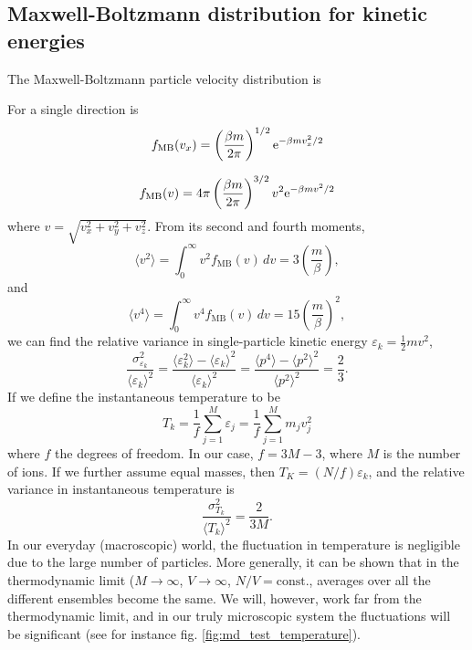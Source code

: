 \documentclass[11pt,bibliography=totoc,index=totoc]{scrbook}   %
\begin{document}
%
\subsection{Maxwell-Boltzmann distribution for kinetic energies}\label{sec:maxwell-boltzmann}
%


The Maxwell-Boltzmann particle velocity distribution is

For a single direction is
\begin{equation}
  f_{\text{MB}}(v_x) = \left(\frac{\beta m}{2\pi }\right)^{1/2} \mathrm{e}^{-\beta m v_x^2 / 2}
  \label{eq:maxboltz-vdist-1D}
\end{equation}

\begin{equation}
  f_{\text{MB}}(v) = 4\pi\left(\frac{\beta m}{2\pi }\right)^{3/2} v^2 \mathrm{e}^{-\beta m v^2 / 2}
  \label{eq:maxboltz-vdist}
\end{equation}
where $v=\sqrt{v_x^2+v_y^2+v_z^2}$.
From its second and fourth moments,
\begin{equation}
  \langle v^2 \rangle = \int_0^{\infty} v^2 f_{\text{MB}}(v) \,dv = 3\left(\frac{m}{\beta}\right),
\end{equation}
and
\begin{equation}
  \langle v^4 \rangle = \int_0^{\infty} v^4 f_{\text{MB}}(v) \,dv = 15\left(\frac{m}{\beta}\right)^2,
\end{equation}
we can find the relative variance in single-particle kinetic energy $\varepsilon_k = \frac12 m v^2$,
\begin{equation}
  \frac{\sigma_{\varepsilon_k}^2}{\langle \varepsilon_k \rangle^2} 
  = \frac{\langle \varepsilon_k^2 \rangle - \langle \varepsilon_k \rangle^2}{ \langle \varepsilon_k \rangle^2 }
  = \frac{\langle p^4 \rangle - \langle p^2 \rangle^2}{ \langle p^2 \rangle^2 }
  = \frac{2}{3}.
\end{equation}
If we define the instantaneous temperature to be
\begin{equation}
  T_k = \frac{1}{f} \sum_{j=1}^M \varepsilon_j = \frac{1}{f}\sum_{j=1}^M m_j v_j^2
  \label{eq:kinetictemp}
\end{equation}
where $f$ the degrees of freedom.
In our case, $f=3M-3$, where $M$  is the number of ions.
If we further assume equal masses, then $T_K = (N/f) \varepsilon_k$, and the relative variance in instantaneous temperature is
\begin{equation}
  \frac{\sigma_{T_k}^2}{\langle T_k \rangle^2} = \frac{2}{3M}.
  \label{eq:tempvar}
\end{equation}
In our everyday (macroscopic) world, the fluctuation in temperature is negligible due to the large number of particles. 
More generally, it can be shown that in the thermodynamic limit ($M\to\infty$, $V\to\infty$, $N/V=\text{const.}$, 
averages over all the different ensembles become the same. We will, however, work far from the thermodynamic limit, 
and in our truly microscopic system the fluctuations will be significant (see for instance fig. \ref{fig:md_test_temperature}).
\end{document}
